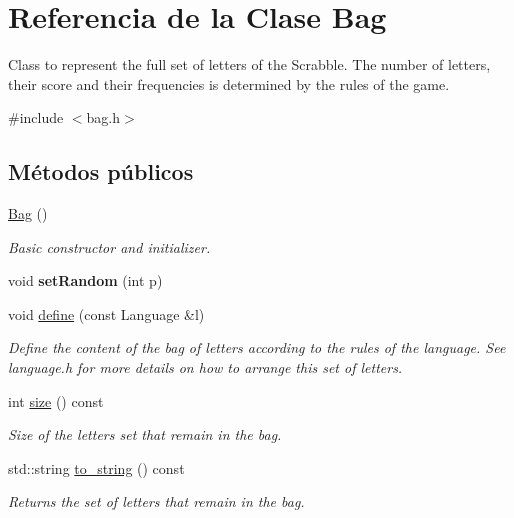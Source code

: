 \hypertarget{classBag}{}\section{Referencia de la Clase Bag}
\label{classBag}


Class to represent the full set of letters of the Scrabble. The number of letters, their score and their frequencies is determined by the rules of the game.  




{\ttfamily \#include $<$bag.\+h$>$}

\subsection*{Métodos públicos}
\begin{DoxyCompactItemize}
\item 
\mbox{\label{classBag_ae0593c22c7dd8b32cab469af92fb200c}} 
\hyperlink{classBag_ae0593c22c7dd8b32cab469af92fb200c}{Bag} ()
\begin{DoxyCompactList}\small\item\em Basic constructor and initializer. \end{DoxyCompactList}\item 
\mbox{\label{classBag_a6ef22128815a22c43a905f03db123b90}} 
void {\bfseries set\+Random} (int p)
\item 
void \hyperlink{classBag_ad380d36f2628b3ffe0ca19cfe53d7c19}{define} (const Language \&l)
\begin{DoxyCompactList}\small\item\em Define the content of the bag of letters according to the rules of the language. See language.\+h for more details on how to arrange this set of letters. \end{DoxyCompactList}\item 
int \hyperlink{classBag_a32652be363a0f5d189b029ed863e5bf2}{size} () const
\begin{DoxyCompactList}\small\item\em Size of the letters set that remain in the bag. \end{DoxyCompactList}\item 
std\+::string \hyperlink{classBag_ac63bdc8c3ceed6d86db66b9d399764ab}{to\+\_\+string} () const
\begin{DoxyCompactList}\small\item\em Returns the set of letters that remain in the bag. \end{DoxyCompactList}\item 

\end{DoxyCompactItemize}

